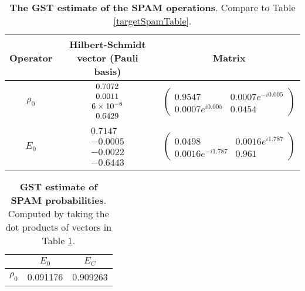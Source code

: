 {\begin{table}[h]
\begin{center}
\begin{tabular}[l]{|c|c|c|}
\hline
Operator & Hilbert-Schmidt vector (Pauli basis) & Matrix \\ \hline
$\rho_{0}$ & $ \begin{array}{c}
0.7072 \\ 
0.0011 \\ 
6\times 10^{-6} \\ 
0.6429
 \end{array} $
 & $ \left(\!\!\begin{array}{cc}
0.9547 & 0.0007e^{-i0.005} \\ 
0.0007e^{i0.005} & 0.0454
 \end{array}\!\!\right) $
 \\ \hline
$E_{0}$ & $ \begin{array}{c}
0.7147 \\ 
-0.0005 \\ 
-0.0022 \\ 
-0.6443
 \end{array} $
 & $ \left(\!\!\begin{array}{cc}
0.0498 & 0.0016e^{i1.787} \\ 
0.0016e^{-i1.787} & 0.961
 \end{array}\!\!\right) $
 \\ \hline
\end{tabular}

\caption{\textbf{The GST estimate of the SPAM operations}.  Compare to Table \ref{targetSpamTable}.\label{bestCPTPGatesetSpamTable}}
\end{center}
\end{table}

\begin{table}[h]
\begin{center}
\begin{tabular}[l]{|c|c|c|}
\hline
 & $E_{0}$ & $E_C$ \\ \hline
$\rho_{0}$ & 0.091176 & 0.909263 \\ \hline
\end{tabular}

\caption{\textbf{GST estimate of SPAM probabilities}.  Computed by taking the dot products of vectors in Table \ref{bestCPTPGatesetSpamTable}.\label{bestCPTPGatesetSpamParametersTable}}
\end{center}
\end{table}

}
